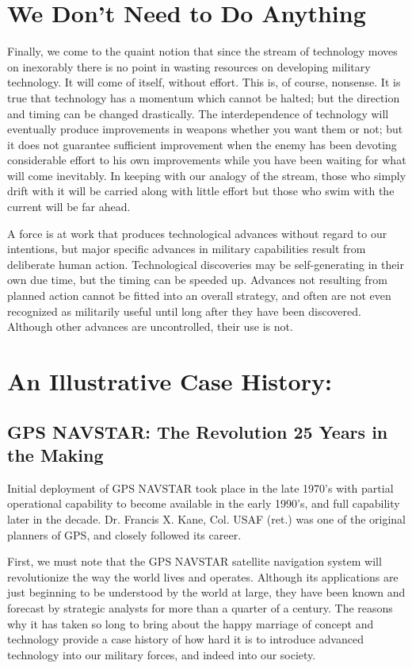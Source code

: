 \section{We Don't Need to Do Anything}
Finally, we come to the quaint notion that since the stream of technology moves on inexorably there is no point in wasting resources on developing military technology. It will come of itself, without effort. This is, of course, nonsense. It is true that technology has a momentum which cannot be halted; but the direction and timing can be changed drastically. The interdependence of technology will eventually produce improvements in weapons whether you want them or not; but it does not guarantee sufficient improvement when the enemy has been devoting considerable effort to his own improvements while you have been waiting for what will come inevitably. In keeping with our analogy of the stream, those who simply drift with it will be carried along with little effort but those who swim with the current will be far ahead.

A force is at work that produces technological advances without regard to our intentions, but major specific advances in military capabilities result from deliberate human action. Technological discoveries may be self-generating in their own due time, but the timing can be speeded up. Advances not resulting from planned action cannot be fitted into an overall strategy, and often are not even recognized as militarily useful until long after they have been discovered. Although other advances are uncontrolled, their use is not.

\section{An Illustrative Case History:}
\subsection{GPS NAVSTAR: The Revolution 25 Years in the Making}
Initial deployment of GPS NAVSTAR took place in the late 1970's with partial operational capability to become available in the early 1990's, and full capability later in the decade. Dr. Francis X. Kane, Col. USAF (ret.) was one of the original planners of GPS, and closely followed its career.

First, we must note that the GPS NAVSTAR satellite navigation system will revolutionize the way the world lives and operates. Although its applications are just beginning to be understood by the world at large, they have been known and forecast by strategic analysts for more than a quarter of a century. The reasons why it has taken so long to bring about the happy marriage of concept and technology provide a case history of how hard it is to introduce advanced technology into our military forces, and indeed into our society.


